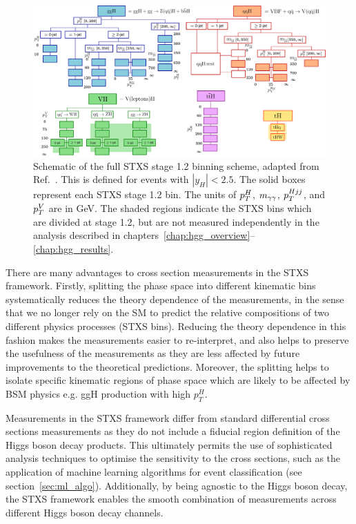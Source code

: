 \begin{figure}[htb!]
  \centering
  \includegraphics[width=1\linewidth]{Figures/theory/allSTXSbins.pdf}
  \caption[STXS stage 1.2 binning scheme]
  {
    Schematic of the full STXS stage 1.2 binning scheme, adapted from Ref.~\cite{deFlorian:2016spz}. This is defined for events with $|y_H|<2.5$. The solid boxes represent each STXS stage 1.2 bin. The units of $p_T^H$, $m_{\gamma\gamma}$, $p_T^{Hjj}$, and $p_T^V$ are in GeV. The shaded regions indicate the STXS bins which are divided at stage 1.2, but are not measured independently in the \Hgg analysis described in chapters~\ref{chap:hgg_overview}--\ref{chap:hgg_results}.
  }
  \label{fig:stxs_schematic}
\end{figure}

There are many advantages to cross section measurements in the STXS framework. Firstly, splitting the phase space into different kinematic bins systematically reduces the theory dependence of the measurements, in the sense that we no longer rely on the SM to predict the relative compositions of two different physics processes (STXS bins). Reducing the theory dependence in this fashion makes the measurements easier to re-interpret, and also helps to preserve the usefulness of the measurements as they are less affected by future improvements to the theoretical predictions. Moreover, the splitting helps to isolate specific kinematic regions of phase space which are likely to be affected by BSM physics e.g. ggH production with high $p_T^H$. 

Measurements in the STXS framework differ from standard differential cross sections measurements as they do not include a fiducial region definition of the Higgs boson decay products. This ultimately permits the use of sophisticated analysis techniques to optimise the sensitivity to the cross sections, such as the application of machine learning algorithms for event classification (see section~\ref{sec:ml_algo}). Additionally, by being agnostic to the Higgs boson decay, the STXS framework enables the smooth combination of measurements across different Higgs boson decay channels. 

